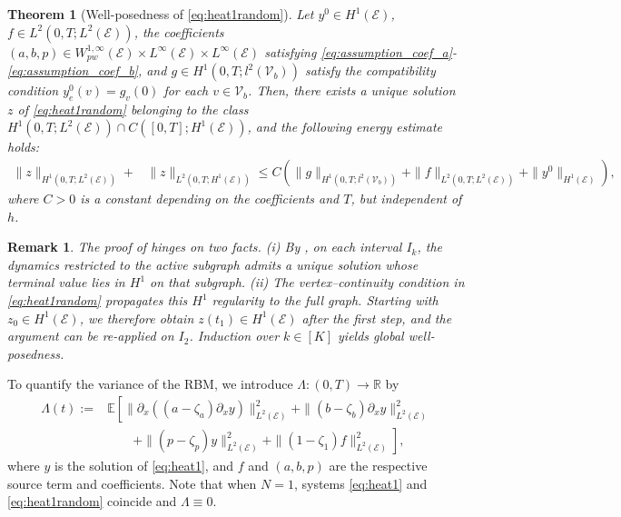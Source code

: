 \documentclass[a4paper, 10pt, english]{article}
\def\R{\mathbb R}
\def\to{\rightarrow}
\newtheorem{theorem}{Theorem}[section]
\newtheorem{remark}{Remark}[section]
\begin{document}
\begin{theorem}[{Well-posedness of \eqref{eq:heat1random}}]\label{th:wellpossednes_random}
    Let $y^0 \in H^1(\mathcal{E})$, $f \in L^2(0, T; L^2(\mathcal{E}))$, the coefficients $(a, b, p) \in W^{1,\infty}_{pw}(\mathcal{E}) \times L^\infty(\mathcal{E}) \times L^\infty(\mathcal{E})$ satisfying \eqref{eq:assumption_coef_a}-\eqref{eq:assumption_coef_b}, and $g \in H^1(0, T; l^2(\mathcal{V}_b))$ satisfy the compatibility condition $y^0_e(v) = g_v(0)$ for each $v \in \mathcal{V}_b$. Then, there exists a unique solution $z$ of \eqref{eq:heat1random} belonging to the class $H^{1}(0, T; L^2(\mathcal{E})) \cap C([0, T]; H^1(\mathcal{E}))$, and the following energy estimate holds:
    \begin{align}\label{eq:energy_heat}
     \|z\|_{H^1(0, T; L^2(\mathcal{E}))} + &\|z\|_{L^2(0, T; H^1(\mathcal{E}))} \leq C \left( \|g\|_{H^1(0, T; l^2(\mathcal{V}_b))} + \|f\|_{L^2(0, T; L^2(\mathcal{E}))}+ \|y^0\|_{H^1(\mathcal{E})} \right),
    \end{align}
    where $C > 0$  is a constant depending on the coefficients and $T$, but independent of $h$. 
\end{theorem}

\begin{remark}
The proof of  hinges on two facts. (i) By , on each interval $I_k$, the dynamics restricted to the active subgraph admits a unique solution whose terminal value lies in $H^{1}$ on that subgraph. (ii)  The vertex–continuity condition in \eqref{eq:heat1random} propagates this $H^{1}$ regularity to the full graph.  
Starting with $z_0\in H^{1}(\mathcal{E})$, we therefore obtain $z(t_1)\in H^{1}(\mathcal{E})$ after the first step, and the argument can be re-applied on $I_{2}$. Induction over $k\in[K]$ yields global well-posedness.
\end{remark}

\smallbreak

To quantify the variance of the RBM, we introduce $\Lambda:(0,T)\to\R$ by
\begin{align}\label{eq:def_lambda}
     \Lambda(t) :=&
    \mathbb{E}\left[\|\partial_{x}((a - \zeta_a) \partial_x y)\|_{L^2(\mathcal{E})}^2 + \| (b - \zeta_b) \partial_x y\|_{L^2(\mathcal{E})}^2\right.\\
    &\nonumber\qquad\left.+ \|(p - \zeta_p) y\|_{L^2(\mathcal{E})}^2 + \|(1-\zeta_1 ) f\|_{L^2(\mathcal{E})}^2\right],
\end{align}
where $y$ is the solution of \eqref{eq:heat1}, and $f$ and $(a,b,p)$ are the respective source term and coefficients. Note that when $N = 1$,  systems \eqref{eq:heat1} and \eqref{eq:heat1random} coincide and $\Lambda \equiv 0$.
\end{document}
